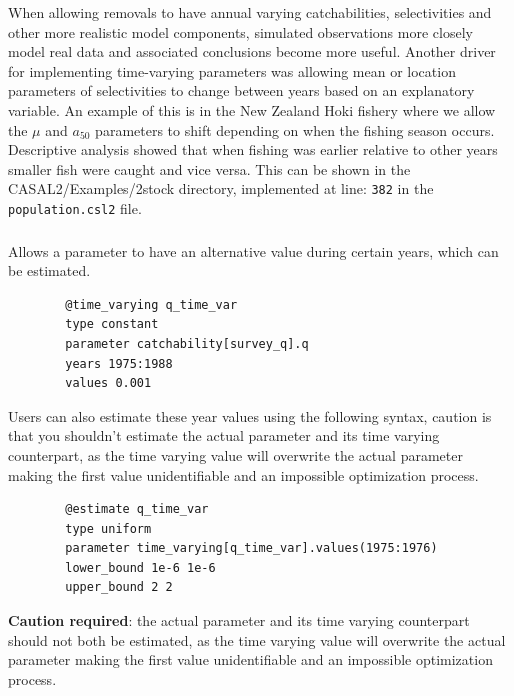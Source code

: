 When allowing removals to have annual varying catchabilities, selectivities and other more realistic model components, simulated observations more closely model real data and associated conclusions become more useful. Another driver for implementing time-varying parameters was allowing mean or location parameters of selectivities to change between years based on an explanatory variable. An example of this is in the New Zealand Hoki fishery where we allow the $\mu$ and $a_{50}$ parameters to shift depending on when the fishing season occurs. Descriptive analysis showed that when fishing was earlier relative to other years smaller fish were caught and vice versa. This can be shown in the CASAL2/Examples/2stock directory, implemented at line: \texttt{382} in the \texttt{population.csl2} file.

\subsubsection[Constant]{}
Allows a parameter to have an alternative value during certain years, which can be estimated.
{\small{\begin{verbatim}
		@time_varying q_time_var
		type constant
		parameter catchability[survey_q].q
		years 1975:1988
		values 0.001
		\end{verbatim}}}

Users can also estimate these year values using the following syntax, caution is that you shouldn't estimate the actual parameter and its time varying counterpart, as the time varying value will overwrite the actual parameter making the first value unidentifiable and an impossible optimization process.
{\small{\begin{verbatim}
		@estimate q_time_var
		type uniform
		parameter time_varying[q_time_var].values(1975:1976)
		lower_bound 1e-6 1e-6
		upper_bound 2 2
		\end{verbatim}}}
	
\textbf{Caution required}: the actual parameter and its time varying counterpart should not both be estimated, as the time varying value will overwrite the actual parameter making the first value unidentifiable and an impossible optimization process.

\subsubsection[Random Walk]{}


